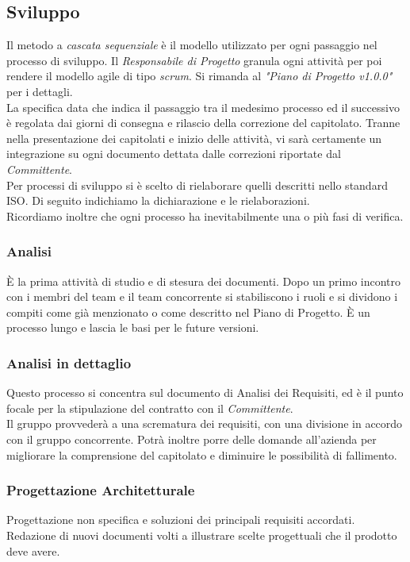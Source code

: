 \documentclass[12pt,a4paper,titlepage]{article}
\begin{document}
\subsection{Sviluppo}
Il metodo a \textit{cascata sequenziale} è il modello utilizzato per ogni passaggio nel processo di sviluppo. Il \textit{Responsabile di Progetto} granula ogni attività per poi rendere il modello agile di tipo \textit{scrum}. Si rimanda al \textit{"Piano di Progetto v1.0.0"} per i dettagli.\\
La specifica data che indica il passaggio tra il medesimo processo ed il successivo è regolata dai giorni di consegna e rilascio della correzione del capitolato. Tranne nella presentazione dei capitolati e inizio delle attività, vi sarà certamente un integrazione su ogni documento dettata dalle correzioni riportate dal \textit{Committente}.\\
Per processi di sviluppo si è scelto di rielaborare quelli descritti nello standard ISO. Di seguito indichiamo la dichiarazione e le rielaborazioni.\\
Ricordiamo inoltre che ogni processo ha inevitabilmente una o più fasi di verifica.

\subsubsection{Analisi}
È la prima attività di studio e di stesura dei documenti. Dopo un primo incontro con i membri del team e il team concorrente si stabiliscono i ruoli e si dividono i compiti come già menzionato o come descritto nel Piano di Progetto. È un processo lungo e lascia le basi per le future versioni.

\subsubsection{Analisi in dettaglio}
Questo processo si concentra sul documento di Analisi dei Requisiti, ed è il punto focale per la stipulazione del contratto con il \textit{Committente}. \\Il gruppo provvederà a una scrematura dei requisiti, con una divisione in accordo con il gruppo concorrente. Potrà inoltre porre delle domande all'azienda per migliorare la comprensione del capitolato e diminuire le possibilità di fallimento.

\subsubsection{Progettazione Architetturale} 
Progettazione non specifica e soluzioni dei principali requisiti accordati. \\ Redazione di nuovi documenti volti a illustrare scelte progettuali che il prodotto deve avere.
\end{document}
